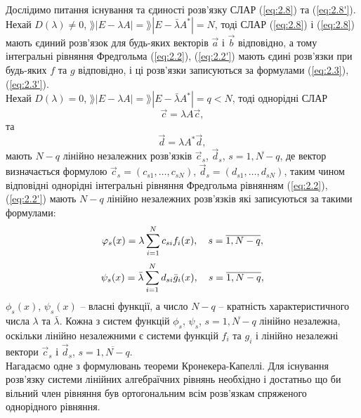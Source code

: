 Дослідимо питання існування та єдиності розв'язку СЛАР (\ref{eq:2.8}) та (\ref{eq:2.8'}). \\

Нехай $D(\lambda) \ne 0$, $\rang |E - \lambda A| = \rang |E - \bar \lambda A^*| = N$, тоді СЛАР (\ref{eq:2.8}) і (\ref{eq:2.8}) мають єдиний розв’язок для будь-яких векторів $\vec a$ і $\vec b$ відповідно, а тому інтегральні рівняння Фредгольма (\ref{eq:2.2}), (\ref{eq:2.2'}) мають єдині розв’язки при будь-яких $f$ та $g$ відповідно, і ці розв’язки записуються за формулами (\ref{eq:2.3}), (\ref{eq:2.3'}). \\

Нехай $D(\lambda) = 0$, $\rang |E - \lambda A| = \rang |E - \bar \lambda A^*| = q < N$, тоді однорідні СЛАР 
\begin{equation}
	\label{eq:2.9}
	\vec c = \lambda A \vec c,
\end{equation}
та
\begin{equation}
	\label{eq:2.9'}
	\vec d = \lambda A^* \vec d,
\end{equation}
мають $N - q$ лінійно незалежних розв’язків $\vec c_s$, $\vec d_s$, $s = \overline{1, N - q}$, де вектор визначається формулою $\vec c_s = (c_{s1}, \ldots, c_{sN})$, $\vec d_s = (d_{s1}, \ldots, d_{sN})$, таким чином відповідні однорідні інтегральні рівняння Фредгольма рівнянням (\ref{eq:2.2}), (\ref{eq:2.2'}) мають $N - q$ лінійно незалежних розв’язків які записуються за такими формулами:
\begin{equation}
	\label{eq:2.10}
	\varphi_s(x) = \lambda \displaystyle\sum\limits_{i = 1}^N c_{si} f_i(x), \quad s = \overline{1, N - q},
\end{equation}
\begin{equation}
	\label{eq:2.10'}
	\psi_s(x) = \bar \lambda \displaystyle\sum\limits_{i = 1}^N d_{si} \bar g_i(x), \quad s = \overline{1, N - q},
\end{equation}
$\phi_s(x)$, $\psi_s(x)$ -- власні функції, а число $N - q$ -- кратність характеристичного числа $\lambda$ та $\bar \lambda$. Кожна з систем функцій $\phi_s$, $\psi_s$, $s = \overline{1, N - q}$ лінійно незалежна, оскільки лінійно незалежними є системи функцій $f_i$ та $g_i$ і лінійно незалежні вектори $\vec c_s$ і $\vec d_s$, $s = \overline{1, N - q}$. \\

Нагадаємо одне з формулювань теореми Кронекера-Капеллі. Для існування розв’язку системи лінійних алгебраїчних рівнянь необхідно і достатньо що би вільний член рівняння був ортогональним всім розв’язкам спряженого однорідного рівняння. \\

